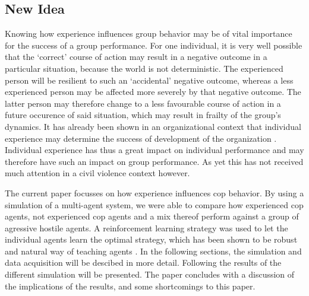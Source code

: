\subsection{New Idea}
Knowing how experience influences group behavior may be of vital importance for the success of a group performance. For one individual, it is very well possible that the `correct' course of action may result in a negative outcome in a particular situation, because the world is not deterministic. The experienced person will be resilient to such an `accidental' negative outcome, whereas a less experienced person may be affected more severely by that negative outcome. The latter person may therefore change to a less favourable course of action in a future occurence of said situation, which may result in frailty of the group's dynamics. It has already been shown in an organizational context that individual experience may determine the success of development of the organization \citep*{reagans2005individual}. Individual experience has thus a great impact on individual performance and may therefore have such an impact on group performance. As yet this has not received much attention in a civil violence context however. 

The current paper focusses on how experience influences cop behavior. By using a simulation of a multi-agent system, we were able to compare how experienced cop agents, not experienced cop agents and a mix thereof perform against a group of agressive hostile agents. A reinforcement learning strategy was used to let the individual agents learn the optimal strategy, which has been shown to be robust and natural way of teaching agents \citep{claus1998dynamics}. In the following sections, the simulation and data acquisition will be descibed in more detail. Following the results of the different simulation will be presented. The paper concludes with a discussion of the implications of the results, and some shortcomings to this paper. 